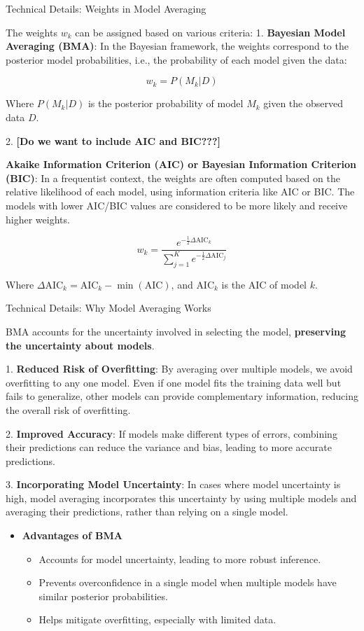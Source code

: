 \begin{frame}{Technical Details: Weights in Model Averaging}

The weights $w_k$ can be assigned based on various criteria:
1. \textbf{Bayesian Model Averaging (BMA)}: In the Bayesian framework, the weights correspond to the posterior model probabilities, i.e., the probability of each model given the data:

   $$ 
   w_k = P(M_k | D) 
   $$

   Where $P(M_k | D)$ is the posterior probability of model $M_k$ given the observed data $D$.

2. \textbf{[Do we want to include AIC and BIC???]}

\textbf{Akaike Information Criterion (AIC) or Bayesian Information Criterion (BIC)}: In a frequentist context, the weights are often computed based on the relative likelihood of each model, using information criteria like AIC or BIC. The models with lower AIC/BIC values are considered to be more likely and receive higher weights.

   $$ 
   w_k = \frac{e^{-\frac{1}{2} \Delta \text{AIC}_k}}{\sum_{j=1}^K e^{-\frac{1}{2} \Delta \text{AIC}_j}} 
   $$

   Where $\Delta \text{AIC}_k = \text{AIC}_k - \min(\text{AIC})$, and $\text{AIC}_k$ is the AIC of model $k$.

\end{frame}

\begin{frame}{Technical Details: Why Model Averaging Works}

BMA accounts for the uncertainty involved in selecting the model, \textbf{preserving the uncertainty about models}.

1. \textbf{Reduced Risk of Overfitting}: By averaging over multiple models, we avoid overfitting to any one model. Even if one model fits the training data well but fails to generalize, other models can provide complementary information, reducing the overall risk of overfitting.
  
2. \textbf{Improved Accuracy}: If models make different types of errors, combining their predictions can reduce the variance and bias, leading to more accurate predictions.

3. \textbf{Incorporating Model Uncertainty}: In cases where model uncertainty is high, model averaging incorporates this uncertainty by using multiple models and averaging their predictions, rather than relying on a single model.

\begin{itemize}
\item \textbf{Advantages of BMA}
\begin{itemize}
\item Accounts for model uncertainty, leading to more robust inference.
\item Prevents overconfidence in a single model when multiple models have similar posterior probabilities.
\item Helps mitigate overfitting, especially with limited data.
\end{itemize}
\end{itemize}
\end{frame}


